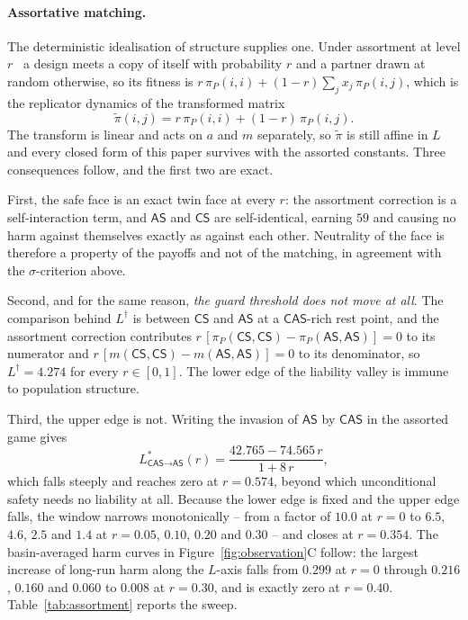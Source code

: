 \documentclass[pdflatex]{sn-jnl}
\theoremstyle{thmstyleone}
\theoremstyle{thmstylethree}
\theoremstyle{thmstyletwo}
\newcommand{\AS}{\textsf{AS}}
\newcommand{\CS}{\textsf{CS}}
\newcommand{\CAS}{\textsf{CAS}}
\newcommand{\piP}{\pi_{P}}
\begin{document}
\paragraph{Assortative matching.}
The deterministic idealisation of structure supplies one. Under assortment at
level $r$~\citep{grafen1979hawk,eshel1982assortment,bergstrom2003algebra} a design meets a copy of
itself with probability $r$ and a partner drawn at random otherwise, so its
fitness is $r\,\piP(i,i)+(1-r)\sum_j x_j\,\piP(i,j)$, which is the replicator
dynamics of the transformed matrix
\begin{equation}
\tilde\pi(i,j)=r\,\piP(i,i)+(1-r)\,\piP(i,j).
\label{eq:assort}
\end{equation}
The transform is linear and acts on $a$ and $m$ separately, so $\tilde\pi$ is
still affine in $L$ and every closed form of this paper survives with the
assorted constants. Three consequences follow, and the first two are exact.

First, the safe face is an exact twin face at every $r$: the assortment
correction is a self-interaction term, and $\AS$ and $\CS$ are self-identical,
earning $59$ and causing no harm against themselves exactly as against each
other. Neutrality of the face is therefore a property of the payoffs and not
of the matching, in agreement with the $\sigma$-criterion above.

Second, and for the same reason, \emph{the guard threshold does not move at
all}. The comparison behind $L^{\dagger}$ is between $\CS$ and $\AS$ at a
$\CAS$-rich rest point, and the assortment correction contributes
$r\,[\piP(\CS,\CS)-\piP(\AS,\AS)]=0$ to its numerator and
$r\,[m(\CS,\CS)-m(\AS,\AS)]=0$ to its denominator, so $L^{\dagger}=4.274$ for
every $r\in[0,1]$. The lower edge of the liability valley is immune to
population structure.

Third, the upper edge is not. Writing the invasion of $\AS$ by $\CAS$ in the
assorted game gives
\begin{equation}
L^{*}_{\CAS\to\AS}(r)=\frac{42.765-74.565\,r}{1+8\,r},
\label{eq:assortupper}
\end{equation}
which falls steeply and reaches zero at $r=0.574$, beyond which unconditional
safety needs no liability at all. Because the lower edge is fixed and the
upper edge falls, the window narrows monotonically -- from a factor of $10.0$
at $r=0$ to $6.5$, $4.6$, $2.5$ and $1.4$ at $r=0.05$, $0.10$, $0.20$ and
$0.30$ -- and closes at $r=0.354$. The basin-averaged harm curves in
Figure~\ref{fig:observation}C follow: the largest increase of long-run harm
along the $L$-axis falls from $0.299$ at $r=0$ through $0.216$, $0.160$ and
$0.060$ to $0.008$ at $r=0.30$, and is exactly zero at $r=0.40$.
Table~\ref{tab:assortment} reports the sweep.
\end{document}
